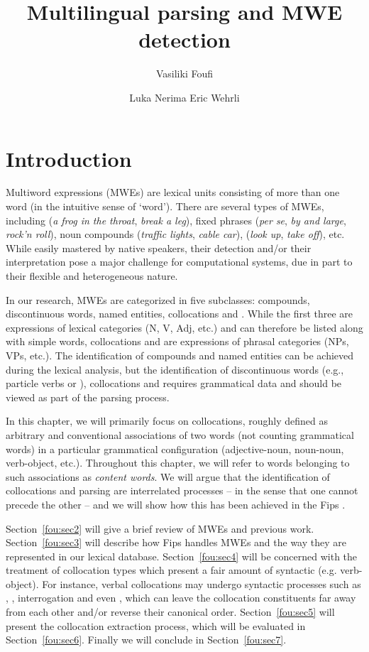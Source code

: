 \documentclass[output=paper]{langsci/langscibook}
\title{Multilingual parsing and {M}{W}{E} detection}
\author{%
Vasiliki Foufi\affiliation{University of Geneva}\and 
Luka Nerima\affiliation{University of Geneva}\lastand 
Eric Wehrli\affiliation{University of Geneva}%
}
\begin{document}
\maketitle

\section{Introduction}

Multiword expressions (MWEs) are lexical units consisting of more than one word (in the intuitive sense of `word'). There are several types of MWEs, including  (\textit{a frog in the throat}, \textit{break a leg}), fixed phrases (\textit{per se}, \textit{by and large}, \textit{rock'n roll}), noun compounds (\textit{traffic lights}, \textit{cable car}),  (\textit{look up}, \textit{take off}), etc. While easily mastered by native speakers, their detection and/or their interpretation pose a major challenge for computational systems, due in part to their flexible and heterogeneous nature. 

In our research, MWEs are categorized in five subclasses: compounds, discontinuous words, named entities, collocations and . While the first three are expressions of lexical categories (N, V, Adj, etc.) and can therefore be listed along with simple words, collocations and  are expressions of phrasal categories (NPs, VPs, etc.). The identification of compounds and named entities can be achieved during the lexical analysis, but the identification of discontinuous words (e.g., particle verbs or ), collocations and  requires grammatical data and should be viewed as part of the parsing process. 

In this chapter, we will primarily focus on collocations, roughly defined as arbitrary and conventional associations of two words (not counting grammatical words) in a particular grammatical configuration (adjective-noun, noun-noun, verb-object, etc.). Throughout this chapter, we will refer to words belonging to such associations as \emph{content words}. We will
argue that the identification of collocations and parsing are interrelated processes -- in the sense that one cannot precede the other --  and we will show how this has been achieved in the Fips  \citep{wehrli07,wn15}.%

Section~\ref{fou:sec2} will give a brief review of MWEs and previous work. Section~\ref{fou:sec3} will describe how Fips handles MWEs and the way they are represented in our lexical database. Section~\ref{fou:sec4} will be concerned with the treatment of collocation types which present a fair amount of syntactic  (e.g. verb-object). For instance, verbal collocations may undergo syntactic processes such as , , interrogation and even , which can leave the collocation constituents far away from each other and/or reverse their canonical order. Section~\ref{fou:sec5} will present the collocation extraction process, which will be evaluated in Section~\ref{fou:sec6}. Finally we will conclude in Section~\ref{fou:sec7}.
\end{document}
